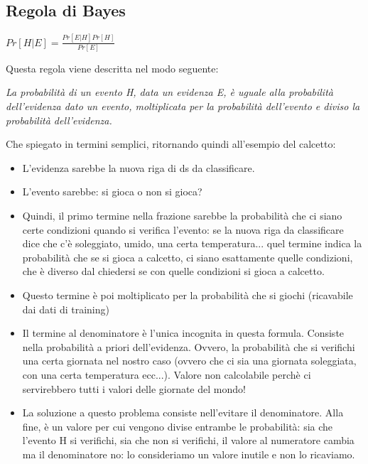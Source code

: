 \newpage

\subsection{Regola di Bayes}
\begin{center}
    \begin{math}
        Pr[ H | E] = \frac{Pr[E | H] Pr[H]}{Pr[E]}
    \end{math}
\end{center}
Questa regola viene descritta nel modo seguente:
\begin{center}
    \textit{La probabilità di un evento H, data un evidenza E, è uguale alla probabilità dell'evidenza dato un evento, moltiplicata per la probabilità dell'evento e diviso la probabilità dell'evidenza.}
\end{center}
Che spiegato in termini semplici, ritornando quindi all'esempio del calcetto:
\begin{itemize}
    \item L'evidenza sarebbe la nuova riga di ds da classificare.
    \item L'evento sarebbe: si gioca o non si gioca?
    \item Quindi, il primo termine nella frazione sarebbe la probabilità che ci siano certe condizioni quando si verifica l'evento: se la nuova riga da classificare dice che c'è soleggiato, umido, una certa temperatura... quel termine indica la probabilità che se si gioca a calcetto, ci siano esattamente quelle condizioni, che è diverso dal chiedersi se con quelle condizioni si gioca a calcetto.
    \item Questo termine è poi moltiplicato per la probabilità che si giochi (ricavabile dai dati di training)
    \item Il termine al denominatore è l'unica incognita in questa formula. Consiste nella probabilità a priori dell'evidenza. Ovvero, la probabilità che si verifichi una certa giornata nel nostro caso (ovvero che ci sia una giornata soleggiata, con una certa temperatura ecc...). Valore non calcolabile perchè ci servirebbero tutti i valori delle giornate del mondo!
    \item La soluzione a questo problema consiste nell'evitare il denominatore. Alla fine, è un valore per cui vengono divise entrambe le probabilità: sia che l'evento H si verifichi, sia che non si verifichi, il valore al numeratore cambia ma il denominatore no: lo consideriamo un valore inutile e non lo ricaviamo.
\end{itemize}
